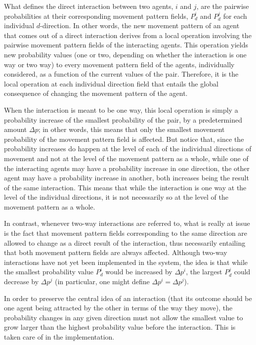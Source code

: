 \documentclass[11pt, a4paper]{article}
\begin{document}
What defines the direct interaction between two agents, $i$ and $j$, are the pairwise probabilities at their corresponding movement pattern fields, $P_{d}^{i}$ and $P_{d}^{j}$ for each individual $d$-direction. In other words, the new movement pattern of an agent that comes out of a direct interaction derives from a local operation involving the pairwise movement pattern fields of the interacting agents. This operation yields new probability values (one or two, depending on whether the interaction is one way or two way) to every movement pattern field of the agents, individually considered, as a function of the current values of the pair. Therefore, it is the local operation at each individual direction field that entails the global consequence of changing the movement pattern of the agent.

When the interaction is meant to be one way, this local operation is simply a probability increase of the smallest probability of the pair, by a predetermined amount $\Delta p$; in other words, this means that only the smallest movement probability of the movement pattern field is affected. But notice that, since the probability increases do happen at the level of each of the individual directions of movement and not at the level of the movement pattern as a whole, while one of the interacting agents may have a probability increase in one direction, the other agent may have a probability increase in another, both increases being the result of the same interaction. This means that while the interaction is one way at the level of the individual directions, it is not necessarily so at the level of the movement pattern as a whole.

In contrast, whenever two-way interactions are referred to, what is really at issue is the fact that movement pattern fields corresponding to the same direction are allowed to change as a direct result of the interaction, thus necessarily entailing that both movement pattern fields are always affected. Although two-way interactions have not yet been implemented in the system, the idea is that while the smallest probability value $P_{d}^{i}$ would be increased by $\Delta p^{i}$, the largest $P_{d}^{j}$ could decrease by $\Delta p^{j}$ (in particular, one might define $\Delta p^{i} = \Delta p^{j}$).

In order to preserve the central idea of an interaction (that its outcome should be one agent being attracted by the other in terms of the way they move), the probability changes in any given direction must not allow the smallest value to grow larger than the highest probability value before the interaction. This is taken care of in the implementation.
\end{document}
